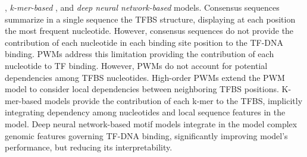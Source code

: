 \documentclass[a4paper, titlepage, openright]{book}
\begin{document}
\citep{siddharthan2010dinucleotide,korhonen2017fast}, \emph{k-mer-based}  \citep{gorkin2012integration}, and \emph{deep neural network-based} \citep{he2021survey} models. Consensus sequences summarize in a single sequence the TFBS structure, displaying at each position the most frequent nucleotide. However, consensus sequences do not provide the contribution of each nucleotide in each binding site position to the TF-DNA binding. PWMs address this limitation providing the contribution of each nucleotide to TF binding. However, PWMs do not account for potential dependencies among TFBS nucleotides. High-order PWMs extend the PWM model to consider local dependencies between neighboring TFBS positions. K-mer-based models provide the contribution of each k-mer to the TFBS, implicitly integrating dependency among nucleotides and local sequence features in the model. Deep neural network-based motif models integrate in the model complex genomic features governing TF-DNA binding, significantly improving model's performance, but reducing its interpretability.
\end{document}
